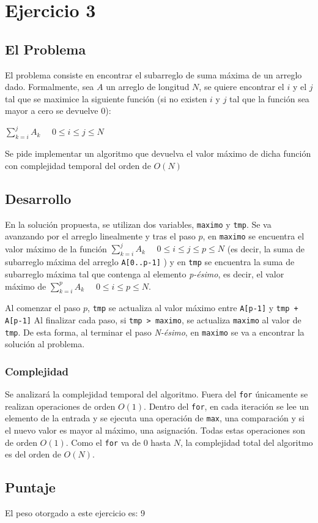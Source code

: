\section{Ejercicio 3}
\subsection{El Problema}
El problema consiste en encontrar el subarreglo de suma máxima de un arreglo dado. Formalmente, sea $A$ un arreglo de longitud $N$, se quiere encontrar el $i$ y el $j$ tal que se maximice la siguiente función (si no existen $i$ y $j$ tal que la función sea mayor a cero se devuelve 0): 
\begin{center} $\sum_{k=i}^{j} A_k$            $ \quad 0\leq i\leq j\leq N$
\end{center}
Se pide implementar un algoritmo que devuelva el valor máximo de dicha función con complejidad temporal del orden de $O(N)$
\subsection{Desarrollo}
En la solución propuesta, se utilizan dos variables, \texttt{maximo} y \texttt{tmp}. Se va avanzando por el arreglo linealmente y tras el paso $p$, en  \texttt{maximo} se encuentra el valor máximo de la función $\sum_{k=i}^{j} A_k$            $ \quad 0\leq i\leq j\leq p \leq N$ (es decir, la suma de subarreglo máxima del arreglo  \texttt{A[0..p-1]} ) y en  \texttt{tmp} se encuentra la suma de subarreglo máxima tal que contenga al elemento \emph{p-ésimo}, es decir, el valor máximo de  $\sum_{k=i}^{p} A_k$            $ \quad 0\leq i\leq p\leq N$.


Al comenzar el paso $p$,  \texttt{tmp} se actualiza al valor máximo entre  \texttt{A[p-1]} y  \texttt{tmp + A[p-1]}
Al finalizar cada paso, si  \texttt{tmp > maximo}, se actualiza  \texttt{maximo} al valor de  \texttt{tmp}.
De esta forma, al terminar el paso \emph{N-ésimo}, en \texttt{maximo} se va a encontrar la solución al problema.

\subsubsection{Complejidad}
Se analizará la complejidad temporal del algoritmo.
Fuera del \texttt{for} únicamente se realizan operaciones de orden $O(1)$. Dentro del \texttt{for}, en cada iteración se lee un elemento de la entrada y se ejecuta una operación de \texttt{max}, una comparación y si el nuevo valor es mayor al máximo, una asignación. Todas estas operaciones son de orden $O(1)$.
Como el \texttt{for} va de $0$ hasta $N$, la complejidad total del algoritmo es del orden de $O(N)$.

\subsection{Puntaje}
El peso otorgado a este ejercicio es: 9